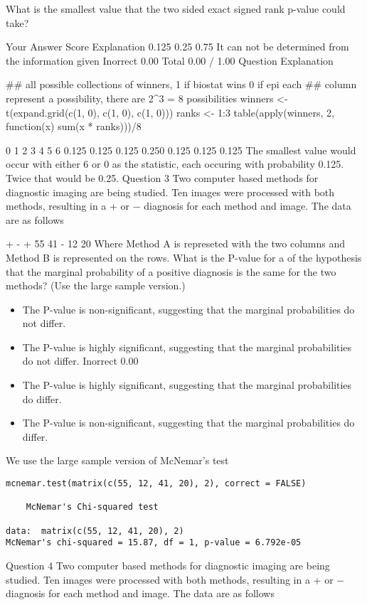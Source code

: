 What is the smallest value that the two sided exact signed rank p-value could take?

Your Answer		Score	Explanation
0.125			
0.25			
0.75			
It can not be determined from the information given	Inorrect	0.00	
Total		0.00 / 1.00	
Question Explanation

## all possible collections of winners, 1 if biostat wins 0 if epi each
## column represent a possibility, there are 2^3 = 8 possibilities
winners <- t(expand.grid(c(1, 0), c(1, 0), c(1, 0)))
ranks <- 1:3
table(apply(winners, 2, function(x) sum(x * ranks)))/8

    0     1     2     3     4     5     6 
0.125 0.125 0.125 0.250 0.125 0.125 0.125 
The smallest value would occur with either 6 or 0 as the statistic, each occuring with probability 0.125. Twice that would be 0.25.
Question 3
Two computer based methods for diagnostic imaging are being studied. Ten images were processed with both methods, resulting in a + or − diagnosis for each method and image. The data are as follows

+	-
+	55	41
-	12	20
Where Method A is represeted with the two columns and Method B is represented on the rows. What is the P-value for a of the hypothesis that the marginal probability of a positive diagnosis is the same for the two methods? (Use the large sample version.)

\begin{itemize}
\item The P-value is non-significant, suggesting that the marginal probabilities do not differ.			
\item The P-value is highly significant, suggesting that the marginal probabilities do not differ.	Inorrect	0.00	
\item The P-value is highly significant, suggesting that the marginal probabilities do differ.			
\item The P-value is non-significant, suggesting that the marginal probabilities do differ.			
\end{itemize}

We use the large sample version of McNemar's test
\begin{framed}
\begin{verbatim}
mcnemar.test(matrix(c(55, 12, 41, 20), 2), correct = FALSE)

    McNemar's Chi-squared test

data:  matrix(c(55, 12, 41, 20), 2) 
McNemar's chi-squared = 15.87, df = 1, p-value = 6.792e-05
\end{verbatim}
\end{framed}
Question 4
Two computer based methods for diagnostic imaging are being studied. Ten images were processed with both methods, resulting in a + or − diagnosis for each method and image. The data are as follows

